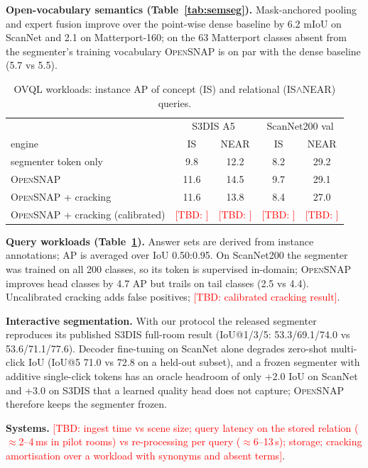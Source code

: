 \documentclass[conference]{IEEEtran}
\newcommand{\TBD}[1]{\textcolor{red}{[TBD: #1]}}
\newcommand{\sys}{\textsc{OpenSNAP}}
\newcommand{\ovql}{\textsc{OVQL}}
\begin{document}
\textbf{Open-vocabulary semantics (Table~\ref{tab:semseg}).} Mask-anchored pooling and expert fusion improve over the
point-wise dense baseline by 6.2 mIoU on ScanNet and 2.1 on Matterport-160; on the 63 Matterport classes absent from the
segmenter's training vocabulary \sys{} is on par with the dense baseline (5.7 vs 5.5).

\begin{table}[t]\centering\caption{\ovql{} workloads: instance AP of concept (\textsf{IS}) and relational
(\textsf{IS}$\wedge$\textsf{NEAR}) queries.}\label{tab:queries}
\begin{tabular}{lcccc}\toprule
 & \multicolumn{2}{c}{S3DIS A5} & \multicolumn{2}{c}{ScanNet200 val} \\
engine & IS & NEAR & IS & NEAR \\\midrule
segmenter token only & 9.8 & 12.2 & 8.2 & 29.2 \\
\sys{} & 11.6 & 14.5 & 9.7 & 29.1 \\
\sys{} + cracking & 11.6 & 13.8 & 8.4 & 27.0 \\
\sys{} + cracking (calibrated) & \TBD{} & \TBD{} & \TBD{} & \TBD{} \\\bottomrule
\end{tabular}\end{table}

\textbf{Query workloads (Table~\ref{tab:queries}).} Answer sets are derived from instance annotations; AP is averaged
over IoU 0.50:0.95. On ScanNet200 the segmenter was trained on all 200 classes, so its token is supervised in-domain;
\sys{} improves head classes by 4.7 AP but trails on tail classes (2.5 vs 4.4). Uncalibrated cracking adds false
positives; \TBD{calibrated cracking result}.

\textbf{Interactive segmentation.} With our protocol the released segmenter reproduces its published S3DIS full-room
result (IoU@1/3/5: 53.3/69.1/74.0 vs 53.6/71.1/77.6). Decoder fine-tuning on ScanNet alone degrades zero-shot
multi-click IoU (IoU@5 71.0 vs 72.8 on a held-out subset), and a frozen segmenter with additive single-click tokens has
an oracle headroom of only +2.0 IoU on ScanNet and +3.0 on S3DIS that a learned quality head does not capture; \sys{}
therefore keeps the segmenter frozen.

\textbf{Systems.} \TBD{ingest time vs scene size; query latency on the stored relation ($\approx$2--4\,ms in pilot rooms)
vs re-processing per query ($\approx$6--13\,s); storage; cracking amortisation over a workload with synonyms and absent
terms}.
\end{document}
